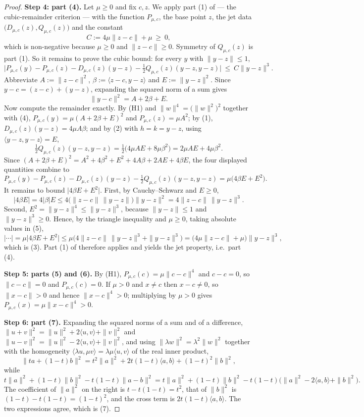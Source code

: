 \begin{proof}
\medskip\noindent\textbf{Step 4: part (4).} Let $\mu\ge0$ and fix $c,z$. We apply part (1)
of  --- the cubic-remainder criterion --- with the function
$P_{\mu,c}$, the base point $z$, the jet data $\big(D_{\mu,c}(z),Q_{\mu,c}(z)\big)$ and the
constant
\[
 C:=4\mu\|z-c\|+\mu\ \ge\ 0 ,
\]
which is non-negative because $\mu\ge0$ and $\|z-c\|\ge0$. Symmetry of $Q_{\mu,c}(z)$ is
part (1). So it remains to prove the cubic bound: for every $y$ with $\|y-z\|\le1$,
\[
 \Big|P_{\mu,c}(y)-P_{\mu,c}(z)-D_{\mu,c}(z)(y-z)
   -\tfrac12Q_{\mu,c}(z)(y-z,y-z)\Big|\ \le\ C\|y-z\|^{3}. \tag{3}
\]
Abbreviate $A:=\|z-c\|^{2}$, $\beta:=\langle z-c,y-z\rangle$ and $E:=\|y-z\|^{2}$. Since
$y-c=(z-c)+(y-z)$, expanding the squared norm of a sum gives
\[
 \|y-c\|^{2}=A+2\beta+E . \tag{4}
\]
Now compute the remainder exactly. By (H1) and $\|w\|^{4}=\big(\|w\|^{2}\big)^{2}$ together
with (4), $P_{\mu,c}(y)=\mu(A+2\beta+E)^{2}$ and $P_{\mu,c}(z)=\mu A^{2}$; by (1),
$D_{\mu,c}(z)(y-z)=4\mu A\beta$; and by (2) with $h=k=y-z$, using
$\langle y-z,y-z\rangle=E$,
\[
 \tfrac12Q_{\mu,c}(z)(y-z,y-z)=\tfrac12\big(4\mu A E+8\mu\beta^{2}\big)
  =2\mu A E+4\mu\beta^{2}.
\]
Since $(A+2\beta+E)^{2}=A^{2}+4\beta^{2}+E^{2}+4A\beta+2AE+4\beta E$, the four displayed
quantities combine to
\[
 P_{\mu,c}(y)-P_{\mu,c}(z)-D_{\mu,c}(z)(y-z)-\tfrac12Q_{\mu,c}(z)(y-z,y-z)
  =\mu\big(4\beta E+E^{2}\big). \tag{5}
\]
It remains to bound $\big|4\beta E+E^{2}\big|$. First, by Cauchy--Schwarz and $E\ge0$,
\[
 |4\beta E|=4|\beta|E\le4\big(\|z-c\|\,\|y-z\|\big)\|y-z\|^{2}
  =4\|z-c\|\,\|y-z\|^{3}.
\]
Second, $E^{2}=\|y-z\|^{4}\le\|y-z\|^{3}$, because $\|y-z\|\le1$ and $\|y-z\|^{3}\ge0$.
Hence, by the triangle inequality and $\mu\ge0$, taking absolute values in (5),
\[
 \Big|\cdots\Big|=\mu\big|4\beta E+E^{2}\big|
  \le\mu\Big(4\|z-c\|\,\|y-z\|^{3}+\|y-z\|^{3}\Big)
  =\big(4\mu\|z-c\|+\mu\big)\|y-z\|^{3},
\]
which is (3). Part (1) of  therefore applies and yields the
jet property, i.e.\ part (4).

\medskip\noindent\textbf{Step 5: parts (5) and (6).} By (H1), $P_{\mu,c}(c)=\mu\|c-c\|^{4}$
and $c-c=0$, so $\|c-c\|=0$ and $P_{\mu,c}(c)=0$. If $\mu>0$ and $x\ne c$ then
$x-c\ne0$, so $\|x-c\|>0$ and hence $\|x-c\|^{4}>0$; multiplying by $\mu>0$ gives
$P_{\mu,c}(x)=\mu\|x-c\|^{4}>0$.

\medskip\noindent\textbf{Step 6: part (7).} Expanding the squared norms of a sum and of a
difference, $\|u+v\|^{2}=\|u\|^{2}+2\langle u,v\rangle+\|v\|^{2}$ and
$\|u-v\|^{2}=\|u\|^{2}-2\langle u,v\rangle+\|v\|^{2}$, and using
$\|\lambda w\|^{2}=\lambda^{2}\|w\|^{2}$ together with the homogeneity
$\langle\lambda u,\mu v\rangle=\lambda\mu\langle u,v\rangle$ of the real inner product,
\[
 \|t a+(1-t)b\|^{2}=t^{2}\|a\|^{2}+2t(1-t)\langle a,b\rangle+(1-t)^{2}\|b\|^{2},
\]
while
\[
 t\|a\|^{2}+(1-t)\|b\|^{2}-t(1-t)\|a-b\|^{2}
 =t\|a\|^{2}+(1-t)\|b\|^{2}-t(1-t)\Big(\|a\|^{2}-2\langle a,b\rangle+\|b\|^{2}\Big).
\]
The coefficient of $\|a\|^{2}$ on the right is $t-t(1-t)=t^{2}$, that of $\|b\|^{2}$ is
$(1-t)-t(1-t)=(1-t)^{2}$, and the cross term is $2t(1-t)\langle a,b\rangle$. The two
expressions agree, which is (7).


\end{proof}
